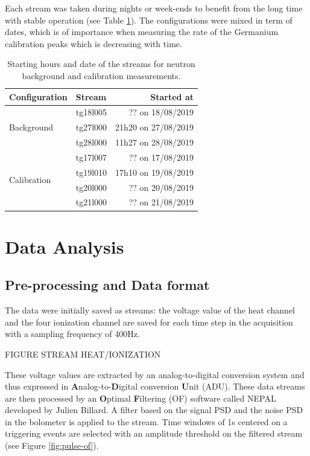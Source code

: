 Each stream was taken during nights or week-ends to benefit from the long time with stable operation (see Table \ref{tab:neutron-streams}). The configurations were mixed in term of dates, which is of importance when measuring the rate of the Germanium calibration peaks which is decreasing with time.

\begin{table}[]
\centering
\begin{tabular}{l|l|r}
Configuration                & Stream   & Started at          \\ \hline
\multirow{3}{*}{Background}  & tg18l005 & ?? on 18/08/2019    \\
                             & tg27l000 & 21h20 on 27/08/2019 \\
                             & tg28l000 & 11h27 on 28/08/2019 \\ \hline
\multirow{4}{*}{Calibration} & tg17l007 & ?? on 17/08/2019    \\
                             & tg19l010 & 17h10 on 19/08/2019 \\
                             & tg20l000 & ?? on 20/08/2019    \\
                             & tg21l000 & ?? on 21/08/2019   
\end{tabular}
\caption{Starting hours and date of the streams for neutron background and calibration measurements.}
\label{tab:neutron-streams}
\end{table}


\section{Data Analysis}


\subsection{Pre-processing and Data format}
\label{par:data-format}
\label{par:of-processing}

The data were initially saved as streams: the voltage value of the heat channel and the four ionization channel are saved for each time step in the acquisition with a sampling frequency of 400Hz. 

{\color{red} FIGURE STREAM HEAT/IONIZATION}

These voltage values are extracted by an analog-to-digital conversion system and thus expressed in \textbf{A}nalog-to-\textbf{D}igital conversion \textbf{U}nit (ADU).
These data streams are then processed by an \textbf{O}ptimal \textbf{F}iltering (OF) software called NEPAL developed by Julien Billard. A filter based on the signal PSD and the noise PSD in the bolometer is applied to the stream. Time windows of 1s centered on a triggering events are selected with an amplitude threshold on the filtered stream (see Figure \ref{fig:pulse-of}).


